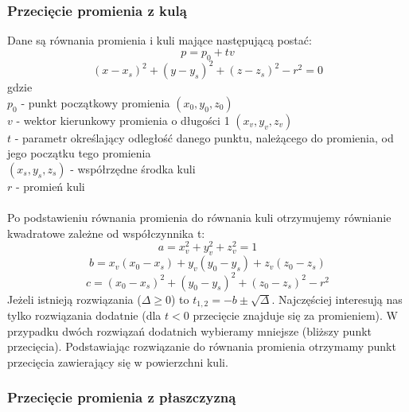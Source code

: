 \subsubsection{Przecięcie promienia z kulą}
Dane są równania promienia i kuli mające następującą postać:
$$p = p_0 + tv$$
$$(x - x_s)^2 + (y - y_s)^2 + (z - z_s)^2 - r^2 = 0$$
gdzie
\\
$p_0$ - punkt początkowy promienia $(x_0, y_0, z_0)$ \\
$v$ - wektor kierunkowy promienia o długości 1 $(x_v, y_v, z_v)$ \\
$t$ - parametr określający odległość danego punktu, należącego do promienia, od jego początku tego promienia \\
$(x_s, y_s, z_s)$ - współrzędne środka kuli \\
$r$ - promień kuli \\
\\
Po podstawieniu równania promienia do równania kuli otrzymujemy równianie kwadratowe zależne od współczynnika t:
$$a = x_v^2 + y_v^2 + z_v^2 = 1$$
$$b = x_v(x_0 - x_s) + y_v(y_0 - y_s) + z_v(z_0 - z_s)$$
$$c = (x_0 - x_s)^2 + (y_0 - y_s)^2 + (z_0 - z_s)^2 - r^2$$
Jeżeli istnieją rozwiązania ($\Delta \geq 0$) to $t_{1,2} = -b \pm \sqrt{\Delta}$. Najczęściej interesują nas tylko rozwiązania dodatnie (dla $t < 0$ przecięcie znajduje się za promieniem). W przypadku dwóch rozwiązań dodatnich wybieramy mniejsze (bliższy punkt przecięcia). Podstawiając rozwiązanie do równania promienia otrzymamy punkt przecięcia zawierający się w powierzchni kuli.

\subsubsection{Przecięcie promienia z płaszczyzną}

